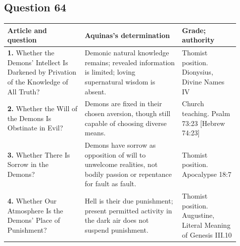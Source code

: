\subsection{Question 64}
\begin{longtable}{@{}>{\raggedright\arraybackslash}p{0.31\linewidth}>{\raggedright\arraybackslash}p{0.39\linewidth}>{\raggedright\arraybackslash}p{0.23\linewidth}@{}}
\toprule
Article and question & Aquinas's determination & Grade; authority\\
\midrule\endhead
\textbf{1.} Whether the Demons' Intellect Is Darkened by Privation of the Knowledge of All Truth? & Demonic natural knowledge remains; revealed information is limited; loving supernatural wisdom is absent. & Thomist position. Dionysius, Divine Names IV\\
\textbf{2.} Whether the Will of the Demons Is Obstinate in Evil? & Demons are fixed in their chosen aversion, though still capable of choosing diverse means. & Church teaching. Psalm 73:23 [Hebrew 74:23]\\
\textbf{3.} Whether There Is Sorrow in the Demons? & Demons have sorrow as opposition of will to unwelcome realities, not bodily passion or repentance for fault as fault. & Thomist position. Apocalypse 18:7\\
\textbf{4.} Whether Our Atmosphere Is the Demons' Place of Punishment? & Hell is their due punishment; present permitted activity in the dark air does not suspend punishment. & Thomist position. Augustine, Literal Meaning of Genesis III.10\\
\bottomrule
\end{longtable}
